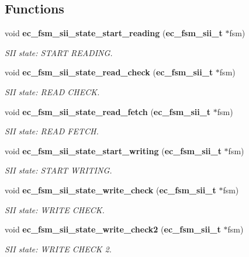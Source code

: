 \subsection*{\-Functions}
\begin{DoxyCompactItemize}
\item 
void {\bf ec\-\_\-fsm\-\_\-sii\-\_\-state\-\_\-start\-\_\-reading} ({\bf ec\-\_\-fsm\-\_\-sii\-\_\-t} $\ast$fsm)
\begin{DoxyCompactList}\small\item\em \-S\-I\-I state\-: \-S\-T\-A\-R\-T \-R\-E\-A\-D\-I\-N\-G. \end{DoxyCompactList}\item 
void {\bf ec\-\_\-fsm\-\_\-sii\-\_\-state\-\_\-read\-\_\-check} ({\bf ec\-\_\-fsm\-\_\-sii\-\_\-t} $\ast$fsm)
\begin{DoxyCompactList}\small\item\em \-S\-I\-I state\-: \-R\-E\-A\-D \-C\-H\-E\-C\-K. \end{DoxyCompactList}\item 
void {\bf ec\-\_\-fsm\-\_\-sii\-\_\-state\-\_\-read\-\_\-fetch} ({\bf ec\-\_\-fsm\-\_\-sii\-\_\-t} $\ast$fsm)
\begin{DoxyCompactList}\small\item\em \-S\-I\-I state\-: \-R\-E\-A\-D \-F\-E\-T\-C\-H. \end{DoxyCompactList}\item 
void {\bf ec\-\_\-fsm\-\_\-sii\-\_\-state\-\_\-start\-\_\-writing} ({\bf ec\-\_\-fsm\-\_\-sii\-\_\-t} $\ast$fsm)
\begin{DoxyCompactList}\small\item\em \-S\-I\-I state\-: \-S\-T\-A\-R\-T \-W\-R\-I\-T\-I\-N\-G. \end{DoxyCompactList}\item 
void {\bf ec\-\_\-fsm\-\_\-sii\-\_\-state\-\_\-write\-\_\-check} ({\bf ec\-\_\-fsm\-\_\-sii\-\_\-t} $\ast$fsm)
\begin{DoxyCompactList}\small\item\em \-S\-I\-I state\-: \-W\-R\-I\-T\-E \-C\-H\-E\-C\-K. \end{DoxyCompactList}\item 
void {\bf ec\-\_\-fsm\-\_\-sii\-\_\-state\-\_\-write\-\_\-check2} ({\bf ec\-\_\-fsm\-\_\-sii\-\_\-t} $\ast$fsm)
\begin{DoxyCompactList}\small\item\em \-S\-I\-I state\-: \-W\-R\-I\-T\-E \-C\-H\-E\-C\-K 2. \end{DoxyCompactList}\item 

\end{DoxyCompactItemize}
